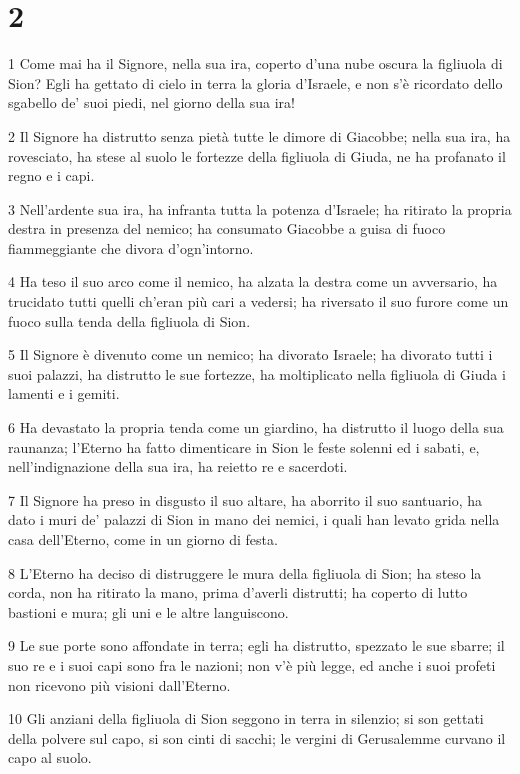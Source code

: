 \chapter{2}

\par 1 Come mai ha il Signore, nella sua ira, coperto d'una nube oscura la figliuola di Sion? Egli ha gettato di cielo in terra la gloria d'Israele, e non s'è ricordato dello sgabello de' suoi piedi, nel giorno della sua ira!
\par 2 Il Signore ha distrutto senza pietà tutte le dimore di Giacobbe; nella sua ira, ha rovesciato, ha stese al suolo le fortezze della figliuola di Giuda, ne ha profanato il regno e i capi.
\par 3 Nell'ardente sua ira, ha infranta tutta la potenza d'Israele; ha ritirato la propria destra in presenza del nemico; ha consumato Giacobbe a guisa di fuoco fiammeggiante che divora d'ogn'intorno.
\par 4 Ha teso il suo arco come il nemico, ha alzata la destra come un avversario, ha trucidato tutti quelli ch'eran più cari a vedersi; ha riversato il suo furore come un fuoco sulla tenda della figliuola di Sion.
\par 5 Il Signore è divenuto come un nemico; ha divorato Israele; ha divorato tutti i suoi palazzi, ha distrutto le sue fortezze, ha moltiplicato nella figliuola di Giuda i lamenti e i gemiti.
\par 6 Ha devastato la propria tenda come un giardino, ha distrutto il luogo della sua raunanza; l'Eterno ha fatto dimenticare in Sion le feste solenni ed i sabati, e, nell'indignazione della sua ira, ha reietto re e sacerdoti.
\par 7 Il Signore ha preso in disgusto il suo altare, ha aborrito il suo santuario, ha dato i muri de' palazzi di Sion in mano dei nemici, i quali han levato grida nella casa dell'Eterno, come in un giorno di festa.
\par 8 L'Eterno ha deciso di distruggere le mura della figliuola di Sion; ha steso la corda, non ha ritirato la mano, prima d'averli distrutti; ha coperto di lutto bastioni e mura; gli uni e le altre languiscono.
\par 9 Le sue porte sono affondate in terra; egli ha distrutto, spezzato le sue sbarre; il suo re e i suoi capi sono fra le nazioni; non v'è più legge, ed anche i suoi profeti non ricevono più visioni dall'Eterno.
\par 10 Gli anziani della figliuola di Sion seggono in terra in silenzio; si son gettati della polvere sul capo, si son cinti di sacchi; le vergini di Gerusalemme curvano il capo al suolo.
